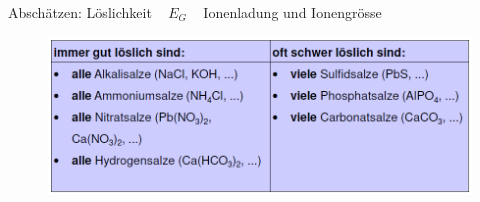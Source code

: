 Abschätzen: Löslichkeit ~ $E_G$ ~ Ionenladung und Ionengrösse
\begin{figure}[htbp]
	\centering
	\includegraphics[width=0.9\linewidth]{images/5_Tabelle_Loeslichkeit.png}
\end{figure}